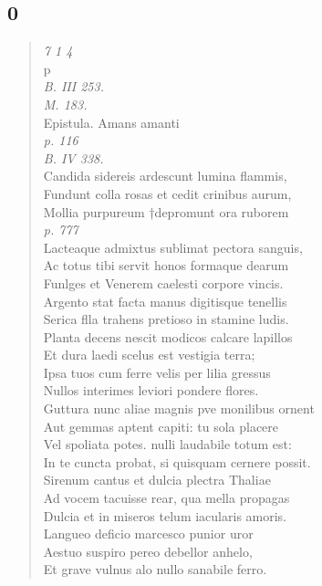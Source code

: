 \documentclass[11pt, a4paper]{report}
\begin{document}
            \subsection*{0}
      \begin{verse}
      \textit{7 1 4} \\  \lbrack  p \\ \textit{B. III 253.} \\ \textit{M. 183.} \\ Epistula. Amans amanti \\ \textit{p. 116} \\ \textit{B. IV 338.} \\ Candida sidereis ardescunt lumina flammis, \\ Fundunt colla rosas et cedit crinibus aurum, \\ 
        ﻿\pagebreak 
    Mollia purpureum †depromunt ora ruborem \\ \textit{p. 777} \\ Lacteaque admixtus sublimat pectora sanguis, \\ Ac totus tibi servit honos formaque dearum \\ Funlges et Venerem caelesti corpore vincis. \\ Argento stat facta manus digitisque tenellis \\ Serica flla trahens pretioso in stamine ludis. \\ Planta decens nescit modicos calcare lapillos \\ Et dura laedi scelus est vestigia terra; \\ Ipsa tuos cum ferre velis per lilia gressus \\ Nullos interimes leviori pondere flores. \\ Guttura nunc aliae magnis \lbrack pve \rbrack  monilibus ornent \\ Aut gemmas aptent capiti: tu sola placere \\ Vel spoliata potes. nulli laudabile totum est: \\ In te cuncta probat, si quisquam cernere possit. \\ Sirenum cantus et dulcia plectra Thaliae \\ Ad vocem tacuisse rear, qua mella propagas \\ Dulcia et in miseros telum iacularis amoris. \\ Langueo deficio marcesco punior uror \\ Aestuo suspiro pereo debellor anhelo, \\ Et grave vulnus alo nullo sanabile ferro. \\ 

\end{verse}
\end{document}
